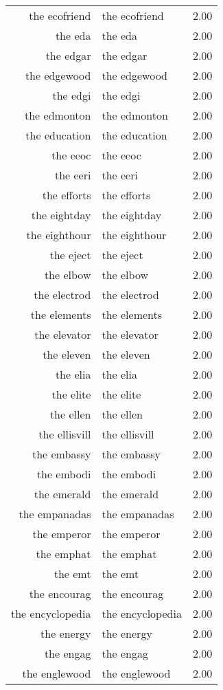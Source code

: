 \begin{table}[ht]
\begin{tabular}{rlr}
  the ecofriend & the ecofriend & 2.00 \\ 
  the eda & the eda & 2.00 \\ 
  the edgar & the edgar & 2.00 \\ 
  the edgewood & the edgewood & 2.00 \\ 
  the edgi & the edgi & 2.00 \\ 
  the edmonton & the edmonton & 2.00 \\ 
  the education & the education & 2.00 \\ 
  the eeoc & the eeoc & 2.00 \\ 
  the eeri & the eeri & 2.00 \\ 
  the efforts & the efforts & 2.00 \\ 
  the eightday & the eightday & 2.00 \\ 
  the eighthour & the eighthour & 2.00 \\ 
  the eject & the eject & 2.00 \\ 
  the elbow & the elbow & 2.00 \\ 
  the electrod & the electrod & 2.00 \\ 
  the elements & the elements & 2.00 \\ 
  the elevator & the elevator & 2.00 \\ 
  the eleven & the eleven & 2.00 \\ 
  the elia & the elia & 2.00 \\ 
  the elite & the elite & 2.00 \\ 
  the ellen & the ellen & 2.00 \\ 
  the ellisvill & the ellisvill & 2.00 \\ 
  the embassy & the embassy & 2.00 \\ 
  the embodi & the embodi & 2.00 \\ 
  the emerald & the emerald & 2.00 \\ 
  the empanadas & the empanadas & 2.00 \\ 
  the emperor & the emperor & 2.00 \\ 
  the emphat & the emphat & 2.00 \\ 
  the emt & the emt & 2.00 \\ 
  the encourag & the encourag & 2.00 \\ 
  the encyclopedia & the encyclopedia & 2.00 \\ 
  the energy & the energy & 2.00 \\ 
  the engag & the engag & 2.00 \\ 
  the englewood & the englewood & 2.00 \\ 

\end{tabular}
\end{table}
